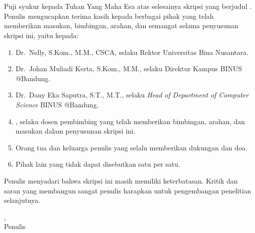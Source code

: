 \thispagestyle{plain}
\section*{}
\justifying
{}
Puji syukur kepada Tuhan Yang Maha Esa atas selesainya skripsi yang berjudul \JudulIndo. Penulis mengucapkan terima kasih kepada berbagai pihak yang telah memberikan masukan, bimbingan, arahan, dan semangat selama penyusunan skripsi ini, yaitu kepada:

\begin{enumerate}
    \item{} Dr.~Nelly, S.Kom., M.M., CSCA, selaku Rektor Universitas Bina Nusantara.
    \item{} Dr.~Johan Muliadi Kerta, S.Kom., M.M., selaku Direktur Kampus BINUS @Bandung.
    \item{} Dr.~Dany Eka Saputra, S.T., M.T., selaku \textit{Head of Department of Computer Science} BINUS @Bandung.
    \item \pembimbingSatu, selaku dosen pembimbing yang telah memberikan bimbingan, arahan, dan masukan dalam penyusunan skripsi ini.
    \item Orang tua dan keluarga penulis yang selalu memberikan dukungan dan doa.
    \item Pihak lain yang tidak dapat disebutkan satu per satu.
\end{enumerate}

Penulis menyadari bahwa skripsi ini masih memiliki keterbatasan. Kritik dan saran yang membangun sangat penulis harapkan untuk pengembangan penelitian selanjutnya.

\vspace*{0.1cm}
\begin{flushright}
\Kota, \tanggalPengesahan\\[0.1cm]
\vspace*{1cm}
Penulis
\end{flushright}
